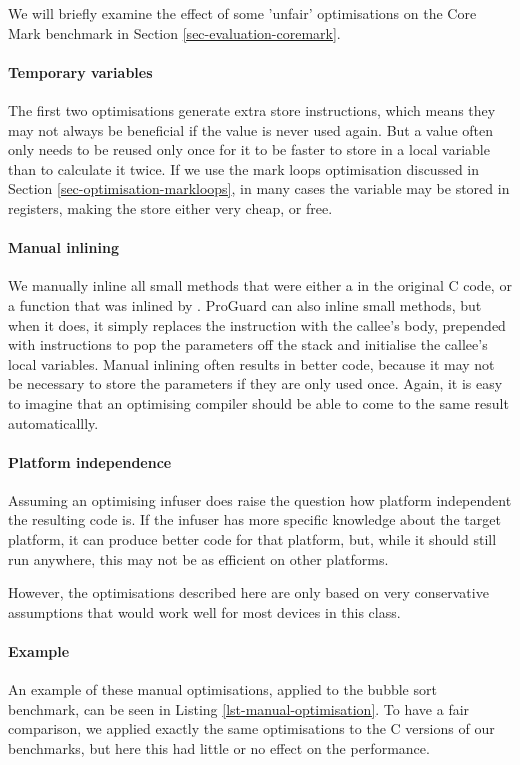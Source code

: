 We will briefly examine the effect of some 'unfair' optimisations on the Core Mark benchmark in Section \ref{sec-evaluation-coremark}.


\paragraph{Temporary variables}
The first two optimisations generate extra store instructions, which means they may not always be beneficial if the value is never used again. But a value often only needs to be reused only once for it to be faster to store in a local variable than to calculate it twice. If we use the mark loops optimisation discussed in Section \ref{sec-optimisation-markloops}, in many cases the variable may be stored in registers, making the store either very cheap, or free.

\paragraph{Manual inlining}
We manually inline all small methods that were either a  in the original C code, or a function that was inlined by . ProGuard can also inline small methods, but when it does, it simply replaces the  instruction with the callee's body, prepended with  instructions to pop the parameters off the stack and initialise the callee's local variables. Manual inlining often results in better code, because it may not be necessary to store the parameters if they are only used once. Again, it is easy to imagine that an optimising compiler should be able to come to the same result automaticallly.

\paragraph{Platform independence}
Assuming an optimising infuser does raise the question how platform independent the resulting code is. If the infuser has more specific knowledge about the target platform, it can produce better code for that platform, but, while it should still run anywhere, this may not be as efficient on other platforms.

However, the optimisations described here are only based on very conservative assumptions that would work well for most devices in this class.

\paragraph{Example} An example of these manual optimisations, applied to the bubble sort benchmark, can be seen in Listing \ref{lst-manual-optimisation}. To have a fair comparison, we applied exactly the same optimisations to the C versions of our benchmarks, but here this had little or no effect on the performance.

